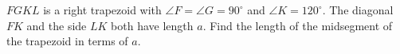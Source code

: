 $FGKL$ is a right trapezoid with $\angle F=\angle G=90^\circ$ and $\angle K=120^\circ$. The diagonal $FK$ and the side $LK$ both have length $a$. Find the length of the midsegment of the trapezoid in terms of $a$.

